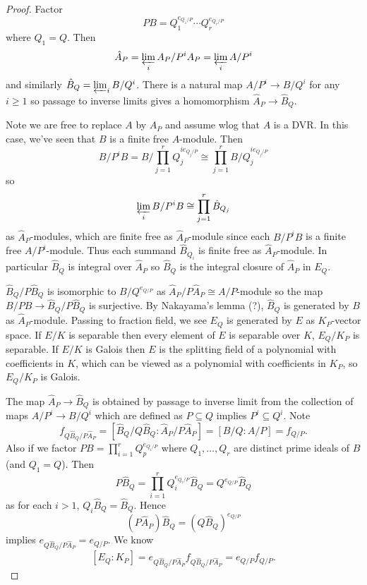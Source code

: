 \documentclass[a4paper]{article}
\begin{document}
\begin{proof}
  Factor
  \[
    PB = Q_1^{e_{Q_1/P}} \cdots Q_r^{e_{Q_r/P}}
  \]
  where \(Q_1 = Q\). Then
  \[
    \hat A_P = \varprojlim_i A_P/P^iA_P = \varprojlim_i A/P^i
  \]
  and similarly \(\hat B_Q = \varprojlim_i B/Q^i\). There is a natural map \(A/P^i \to B/Q^i\) for any \(i \geq 1\) so passage to inverse limits gives a homomorphism \(\hat A_P \to \hat B_Q\).

  Note we are free to replace \(A\) by \(A_P\) and assume wlog that \(A\) is a DVR. In this case, we've seen that \(B\) is a finite free \(A\)-module. Then
  \[
    B/P^iB = B/\prod_{j = 1}^r Q_j^{i e_{Q_j/P}} \cong \prod_{j = 1}^r B/Q_j^{i e_{Q_j/P}}
  \]
  so
  \[
    \varprojlim_i B/P^iB \cong \prod_{j = 1}^r \hat B_{Q_j}
  \]
  as \(\hat A_P\)-modules, which are finite free as \(\hat A_P\)-module since each \(B/P^iB\) is a finite free \(A/P^i\)-module. Thus each summand \(\hat B_{Q_i}\) is finite free as \(\hat A_P\)-module. In particular \(\hat B_Q\) is integral over \(\hat A_P\) so \(\hat B_Q\) is the integral closure of \(\hat A_P\) in \(E_Q\).

  \(\hat B_Q/P \hat B_Q\) is isomorphic to \(B/Q^{e_{Q/P}}\) as \(\hat A_P/P \hat A_P \cong A/P\)-module so the map \(B/PB \to \hat B_Q/P\hat B_Q\) is surjective. By Nakayama's lemma (?), \(\hat B_Q\) is generated by \(B\) as \(\hat A_P\)-module. Passing to fraction field, we see \(E_Q\) is generated by \(E\) as \(K_P\)-vector space. If \(E/K\) is separable then every element of \(E\) is separable over \(K\), \(E_Q/K_P\) is separable. If \(E/K\) is Galois then \(E\) is the splitting field of a polynomial with coefficients in \(K\), which can be viewed as a polynomial with coefficients in \(K_P\), so \(E_Q/K_P\) is Galois.

  The map \(\hat A_P \to \hat B_Q\) is obtained by passage to inverse limit from the collection of maps \(A/P^i \to B/Q^i\) which are defined as \(P \subseteq Q\) implies \(P^i \subseteq Q^i\). Note
  \[
    f_{Q\hat B_Q/P\hat A_P} = [\hat B_Q/Q\hat B_Q: \hat A_P/P\hat A_P] = [B/Q: A/P] = f_{Q/P}.
  \]
  Also if we factor \(PB = \prod_{i = 1}^r Q_p^{e_{Q_i/P}}\) where \(Q_1, \dots, Q_r\) are distinct prime ideals of \(B\) (and \(Q_1 = Q\)). Then
  \[
    P\hat B_Q = \prod_{i = 1}^r Q_i^{e_{Q_i/P}} \hat B_Q = Q^{e_{Q/P}} \hat B_Q
  \]
  as for each \(i > 1\), \(Q_i \hat B_{Q} = \hat B_{Q}\). Hence
  \[
    (P \hat A_P) \hat B_Q = (Q \hat B_Q)^{e_{Q/P}}
  \]
  implies \(e_{Q\hat B_Q/P \hat A_P} = e_{Q/P}\). We know
  \[
   [E_Q: K_P] = e_{Q\hat B_Q/P\hat A_P} f_{Q\hat B_Q/P\hat A_P} = e_{Q/P} f_{Q/P}.
  \]


\end{proof}
\end{document}
